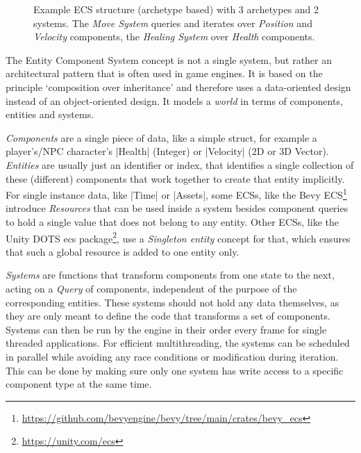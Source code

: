 \begin{figure}[h!]
\caption{Example ECS structure (archetype based) with 3 archetypes and 2 systems. The \textit{Move System} queries and iterates over \textit{Position} and \textit{Velocity} components, the \textit{Healing System} over \textit{Health} components.}
\label{fig:ecs}
\end{figure}

The Entity Component System concept is not a single system, but rather an architectural pattern that is often used in game engines. It is based on the principle `composition over inheritance' and therefore uses a data-oriented design instead of an object-oriented design. It models a \textit{world} in terms of components, entities and systems.

\textit{Components} are a single piece of data, like a simple struct, for example a player's/NPC character's |Health| (Integer) or |Velocity| (2D or 3D Vector). \textit{Entities} are usually just an identifier or index, that identifies a single collection of these (different) components that work together to create that entity implicitly. For single instance data, like |Time| or |Assets|, some ECSs, like the Bevy ECS\footnote{\url{https://github.com/bevyengine/bevy/tree/main/crates/bevy_ecs}} introduce \textit{Resources} that can be used inside a system besides component queries to hold a single value that does not belong to any entity. Other ECSs, like the Unity DOTS ecs package\footnote{\url{https://unity.com/ecs}}, use a \textit{Singleton entity} concept for that, which ensures that such a global resource is added to one entity only.

\textit{Systems} are functions that transform components from one state to the next, acting on a \textit{Query} of components, independent of the purpose of the corresponding entities. These systems should not hold any data themselves, as they are only meant to define the code that transforms a set of components. Systems can then be run by the engine in their order every frame for single threaded applications. For efficient multithreading, the systems can be scheduled in parallel while avoiding any race conditions or modification during iteration. This can be done by making sure only one system has write access to a specific component type at the same time.

